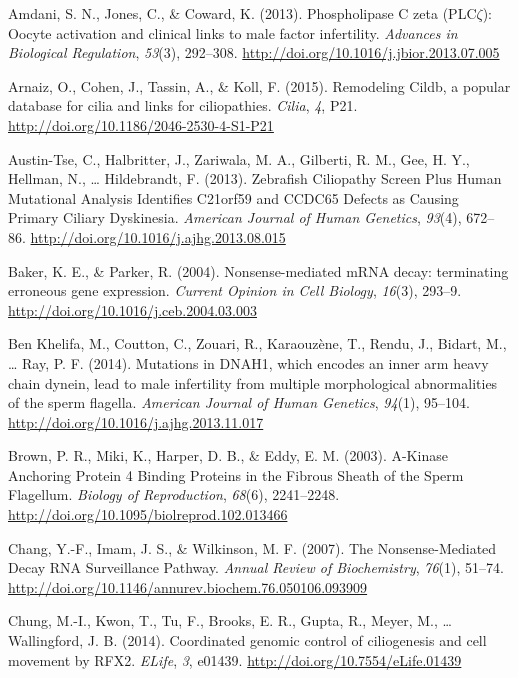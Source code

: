 \documentclass[12pt,twoside]{reedthesis}
\theoremstyle{definition}
\theoremstyle{definition}
\theoremstyle{remark}
\begin{document}
  \hypertarget{ref-Amdani2013}{}
  Amdani, S. N., Jones, C., \& Coward, K. (2013). Phospholipase C zeta
  (PLC\(\zeta\)): Oocyte activation and clinical links to male factor
  infertility. \emph{Advances in Biological Regulation}, \emph{53}(3),
  292--308. \url{http://doi.org/10.1016/j.jbior.2013.07.005}
  
  \hypertarget{ref-Arnaiz2015}{}
  Arnaiz, O., Cohen, J., Tassin, A., \& Koll, F. (2015). Remodeling Cildb,
  a popular database for cilia and links for ciliopathies. \emph{Cilia},
  \emph{4}, P21. \url{http://doi.org/10.1186/2046-2530-4-S1-P21}
  
  \hypertarget{ref-Austin-Tse2013}{}
  Austin-Tse, C., Halbritter, J., Zariwala, M. A., Gilberti, R. M., Gee,
  H. Y., Hellman, N., \ldots{} Hildebrandt, F. (2013). Zebrafish
  Ciliopathy Screen Plus Human Mutational Analysis Identifies C21orf59 and
  CCDC65 Defects as Causing Primary Ciliary Dyskinesia. \emph{American
  Journal of Human Genetics}, \emph{93}(4), 672--86.
  \url{http://doi.org/10.1016/j.ajhg.2013.08.015}
  
  \hypertarget{ref-Baker2004}{}
  Baker, K. E., \& Parker, R. (2004). Nonsense-mediated mRNA decay:
  terminating erroneous gene expression. \emph{Current Opinion in Cell
  Biology}, \emph{16}(3), 293--9.
  \url{http://doi.org/10.1016/j.ceb.2004.03.003}
  
  \hypertarget{ref-BenKhelifa2014}{}
  Ben Khelifa, M., Coutton, C., Zouari, R., Karaouzène, T., Rendu, J.,
  Bidart, M., \ldots{} Ray, P. F. (2014). Mutations in DNAH1, which
  encodes an inner arm heavy chain dynein, lead to male infertility from
  multiple morphological abnormalities of the sperm flagella.
  \emph{American Journal of Human Genetics}, \emph{94}(1), 95--104.
  \url{http://doi.org/10.1016/j.ajhg.2013.11.017}
  
  \hypertarget{ref-Brown2003}{}
  Brown, P. R., Miki, K., Harper, D. B., \& Eddy, E. M. (2003). A-Kinase
  Anchoring Protein 4 Binding Proteins in the Fibrous Sheath of the Sperm
  Flagellum. \emph{Biology of Reproduction}, \emph{68}(6), 2241--2248.
  \url{http://doi.org/10.1095/biolreprod.102.013466}
  
  \hypertarget{ref-Chang2007}{}
  Chang, Y.-F., Imam, J. S., \& Wilkinson, M. F. (2007). The
  Nonsense-Mediated Decay RNA Surveillance Pathway. \emph{Annual Review of
  Biochemistry}, \emph{76}(1), 51--74.
  \url{http://doi.org/10.1146/annurev.biochem.76.050106.093909}
  
  \hypertarget{ref-Chung2014}{}
  Chung, M.-I., Kwon, T., Tu, F., Brooks, E. R., Gupta, R., Meyer, M.,
  \ldots{} Wallingford, J. B. (2014). Coordinated genomic control of
  ciliogenesis and cell movement by RFX2. \emph{ELife}, \emph{3}, e01439.
  \url{http://doi.org/10.7554/eLife.01439}
  
\end{document}
